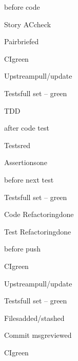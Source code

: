 




\begin{checklist}{before code}
  \item{Story AC}{check}
  \item{Pair}{briefed}
  \item{CI}{green}
  \item{Upstream}{pull/update}
  \item{Tests}{full set -- green}
\end{checklist}

\begin{task}{TDD}

  \begin{checklist}{after code test}
    \item{Tests}{red}
    \item{Assertions}{one}
  \end{checklist}

  \begin{checklist}{before next test}
    \item{Tests}{full set -- green}
    \item{Code Refactoring}{done}
    \item{Test Refactoring}{done}
  \end{checklist}

\end{task}

\begin{checklist}{before push}
  \item{CI}{green}
  \item{Upstream}{pull/update}
  \item{Tests}{full set -- green}
  \item{Files}{added/stashed}
  \item{Commit msg}{reviewed}
  \item{CI}{green}
\end{checklist}


